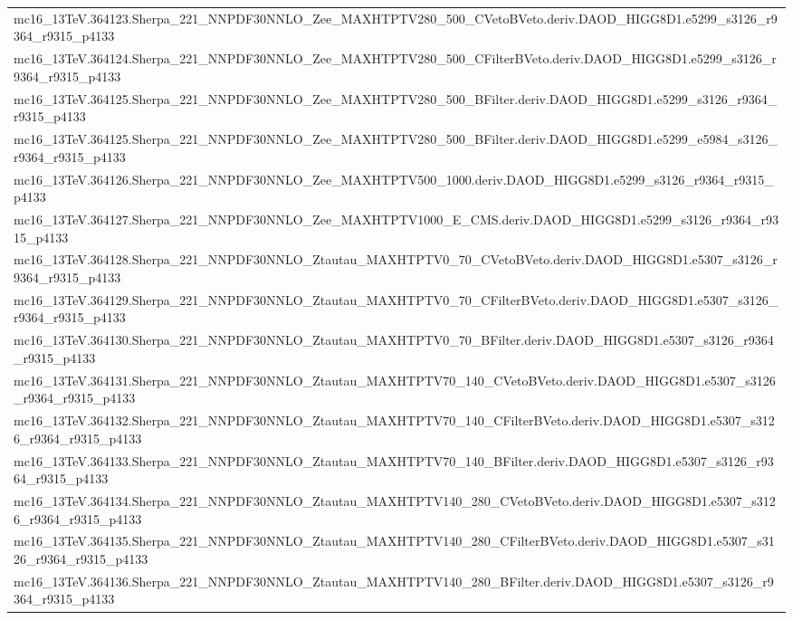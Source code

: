 \begin{adjustwidth}{-3em}{-3em}
\begin{longtable}{l}
mc16\_13TeV.364123.Sherpa\_221\_NNPDF30NNLO\_Zee\_MAXHTPTV280\_500\_CVetoBVeto.deriv.DAOD\_HIGG8D1.e5299\_s3126\_r9364\_r9315\_p4133 \\
mc16\_13TeV.364124.Sherpa\_221\_NNPDF30NNLO\_Zee\_MAXHTPTV280\_500\_CFilterBVeto.deriv.DAOD\_HIGG8D1.e5299\_s3126\_r9364\_r9315\_p4133 \\
mc16\_13TeV.364125.Sherpa\_221\_NNPDF30NNLO\_Zee\_MAXHTPTV280\_500\_BFilter.deriv.DAOD\_HIGG8D1.e5299\_s3126\_r9364\_r9315\_p4133 \\
mc16\_13TeV.364125.Sherpa\_221\_NNPDF30NNLO\_Zee\_MAXHTPTV280\_500\_BFilter.deriv.DAOD\_HIGG8D1.e5299\_e5984\_s3126\_r9364\_r9315\_p4133 \\
mc16\_13TeV.364126.Sherpa\_221\_NNPDF30NNLO\_Zee\_MAXHTPTV500\_1000.deriv.DAOD\_HIGG8D1.e5299\_s3126\_r9364\_r9315\_p4133 \\
mc16\_13TeV.364127.Sherpa\_221\_NNPDF30NNLO\_Zee\_MAXHTPTV1000\_E\_CMS.deriv.DAOD\_HIGG8D1.e5299\_s3126\_r9364\_r9315\_p4133 \\
mc16\_13TeV.364128.Sherpa\_221\_NNPDF30NNLO\_Ztautau\_MAXHTPTV0\_70\_CVetoBVeto.deriv.DAOD\_HIGG8D1.e5307\_s3126\_r9364\_r9315\_p4133 \\
mc16\_13TeV.364129.Sherpa\_221\_NNPDF30NNLO\_Ztautau\_MAXHTPTV0\_70\_CFilterBVeto.deriv.DAOD\_HIGG8D1.e5307\_s3126\_r9364\_r9315\_p4133 \\
mc16\_13TeV.364130.Sherpa\_221\_NNPDF30NNLO\_Ztautau\_MAXHTPTV0\_70\_BFilter.deriv.DAOD\_HIGG8D1.e5307\_s3126\_r9364\_r9315\_p4133 \\
mc16\_13TeV.364131.Sherpa\_221\_NNPDF30NNLO\_Ztautau\_MAXHTPTV70\_140\_CVetoBVeto.deriv.DAOD\_HIGG8D1.e5307\_s3126\_r9364\_r9315\_p4133 \\
mc16\_13TeV.364132.Sherpa\_221\_NNPDF30NNLO\_Ztautau\_MAXHTPTV70\_140\_CFilterBVeto.deriv.DAOD\_HIGG8D1.e5307\_s3126\_r9364\_r9315\_p4133 \\
mc16\_13TeV.364133.Sherpa\_221\_NNPDF30NNLO\_Ztautau\_MAXHTPTV70\_140\_BFilter.deriv.DAOD\_HIGG8D1.e5307\_s3126\_r9364\_r9315\_p4133 \\
mc16\_13TeV.364134.Sherpa\_221\_NNPDF30NNLO\_Ztautau\_MAXHTPTV140\_280\_CVetoBVeto.deriv.DAOD\_HIGG8D1.e5307\_s3126\_r9364\_r9315\_p4133 \\
mc16\_13TeV.364135.Sherpa\_221\_NNPDF30NNLO\_Ztautau\_MAXHTPTV140\_280\_CFilterBVeto.deriv.DAOD\_HIGG8D1.e5307\_s3126\_r9364\_r9315\_p4133 \\
mc16\_13TeV.364136.Sherpa\_221\_NNPDF30NNLO\_Ztautau\_MAXHTPTV140\_280\_BFilter.deriv.DAOD\_HIGG8D1.e5307\_s3126\_r9364\_r9315\_p4133 \\

\end{longtable}
\end{adjustwidth}
